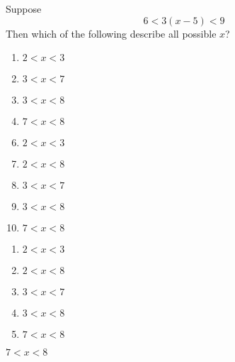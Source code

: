 


 Suppose
\[6<3(x-5)<9\]
Then which of the following describe all possible $x$?


\ifsat
	\begin{enumerate}[label=\Alph*)]
		\item   $2<x<3$  
		\item  $3<x<7$
		\item  $3<x<8$ 
		\item  $7<x<8$ %
	\end{enumerate}
\else
\fi

\ifacteven
	\begin{enumerate}[label=\textbf{\Alph*.},itemsep=\fill,align=left]
		\setcounter{enumii}{5}
		\item   $2<x<3$  
		\item   $2<x<8$
		\item  $3<x<7$
		\addtocounter{enumii}{1}
		\item  $3<x<8$ 
		\item  $7<x<8$ %
	\end{enumerate}
\else
\fi

\ifactodd
	\begin{enumerate}[label=\textbf{\Alph*.},itemsep=\fill,align=left]
		\item   $2<x<3$  
		\item   $2<x<8$
		\item  $3<x<7$
		\item  $3<x<8$ 
		\item  $7<x<8$ %
	\end{enumerate}
\else
\fi

\ifgridin
  $7<x<8$ %

\else
\fi

